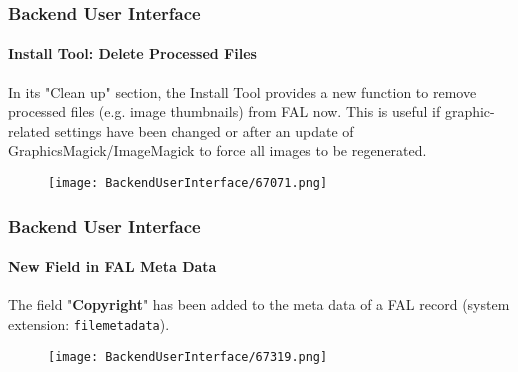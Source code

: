 \begin{frame}[fragile]
	\frametitle{Backend User Interface}
	\framesubtitle{Install Tool: Delete Processed Files}

	In its "Clean up" section, the Install Tool provides a new function to remove
	processed files (e.g. image thumbnails) from FAL now.\newline
	This is useful if graphic-related settings have been changed or after an update of
	GraphicsMagick/ImageMagick to force all images to be regenerated.

	\begin{figure}
		\texttt{[image: BackendUserInterface/67071.png]}
	\end{figure}

\end{frame}

\begin{frame}[fragile]
	\frametitle{Backend User Interface}
	\framesubtitle{New Field in FAL Meta Data}

	The field "\textbf{Copyright}" has been added to the meta data of a FAL record
	(system extension: \texttt{filemetadata}).

	\begin{figure}
		\texttt{[image: BackendUserInterface/67319.png]}
	\end{figure}

\end{frame}


